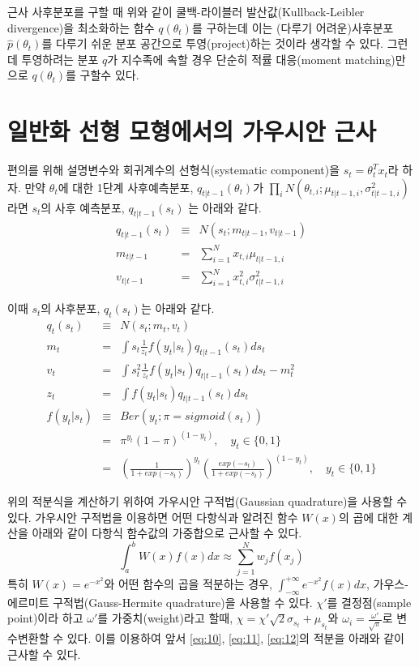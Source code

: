 \documentclass[oneside,b5paper,11pt]{book} %
\begin{document}
근사 사후분포를 구할 때 위와 같이 쿨백-라이블러 발산값(Kullback-Leibler divergence)을 최소화하는 함수 $q(\theta_t)$를 구하는데 이는 (다루기 어려운)사후분포$\hat{p}(\theta_t)$를 다루기 쉬운 분포 공간으로 투영(project)하는 것이라 생각할 수 있다. 그런데 투영하려는 분포 $q$가 지수족에 속할 경우 단순히 적률 대응(moment matching)만으로 $q(\theta_t)$를 구할수 있다.\citep{Murphy2012}


\section{일반화 선형 모형에서의 가우시안 근사}
편의를 위해 설명변수와 회귀계수의 선형식(systematic component)을 $s_t=\theta_t^T x_t$라 하자. 만약 $\theta_t$에 대한 1단계 사후예측분포, $q_{t|t-1}(\theta_t)$가 $\prod_i N(\theta_{t,i};\mu_{t|t-1,i},\sigma^2_{t|t-1,i})$라면 $s_t$의 사후 예측분포, $q_{t|t-1}(s_t)$ 는 아래와 같다.
\begin{eqnarray}
   q_{t|t-1}(s_{t}) &\equiv& N(s_t;m_{t|t-1}, {v}_{t|t-1})
\\ m_{t|t-1} &=& \sum^N_{i=1}x_{t,i}\mu_{t|t-1,i}
\\ {v}_{t|t-1} &=& \sum^N_{i=1}x^2_{t,i}{\sigma}^2_{t|t-1,i}
\end{eqnarray}

이때 $s_t$의 사후분포, $q_t(s_t)$는 아래와 같다.
\begin{eqnarray}
q_t(s_t) &\equiv& N(s_t; m_t, v_t)
\\ m_t &=& \int s_t \frac{1}{z_t} f(y_t|s_t) q_{t|t-1}(s_t)ds_t \label{eq:10}
\\ v_t &=& \int s^2_t \frac{1}{z_t} f(y_t|s_t) q_{t|t-1}(s_t) ds_t - m_t^2 \label{eq:11}
\\ z_t &=& \int f(y_t|s_t) q_{t|t-1}(s_t)ds_t \label{eq:12}
\\ f(y_t|s_t) &\equiv& Ber(y_t;\pi = sigmoid(s_t))
\\ & =& \pi^{y_t} (1-\pi)^{(1-y_t)}, \quad y_t \in \{0,1\}
\\ & =& \left(\frac{1}{1+exp(-s_t)}\right)^{y_t} \left(\frac{exp(-s_t)}{1+exp(-s_t)}\right)^{(1-y_t)}, \quad y_t \in \{0,1\} \nonumber
\end{eqnarray}

위의 적분식을 계산하기 위하여 가우시안 구적법(Gaussian quadrature)을 사용할 수 있다. 가우시안 구적법을 이용하면 어떤 다항식과 알려진 함수 $W(x)$의 곱에 대한 계산을 아래와 같이 다항식 함수값의 가중합으로 근사할 수 있다.$$\int^b_a W(x)f(x)dx \approx \sum^N_{j=1}w_j f(x_j)$$
특히 $W(x)=e^{-x^2}$와 어떤 함수의 곱을 적분하는 경우, $\int^{+\infty}_{-\infty}e^{-x^2}f(x)dx$, 가우스-에르미트 구적법(Gauss-Hermite quadrature)을 사용할 수 있다. $\chi'$를 결정점(sample point)이라 하고 $\omega'$를 가중치(weight)라고 할때,  $\chi=\chi'\sqrt{2}\sigma_{s_t}+\mu_{s_t}$와 $\omega_i = \frac{\omega'}{\sqrt{\pi}}$로 변수변환할 수 있다. 이를 이용하여 앞서 \ref{eq:10}, \ref{eq:11}, \ref{eq:12}의 적분을 아래와 같이 근사할 수 있다.\citep{Zoeter2007}
\end{document}
